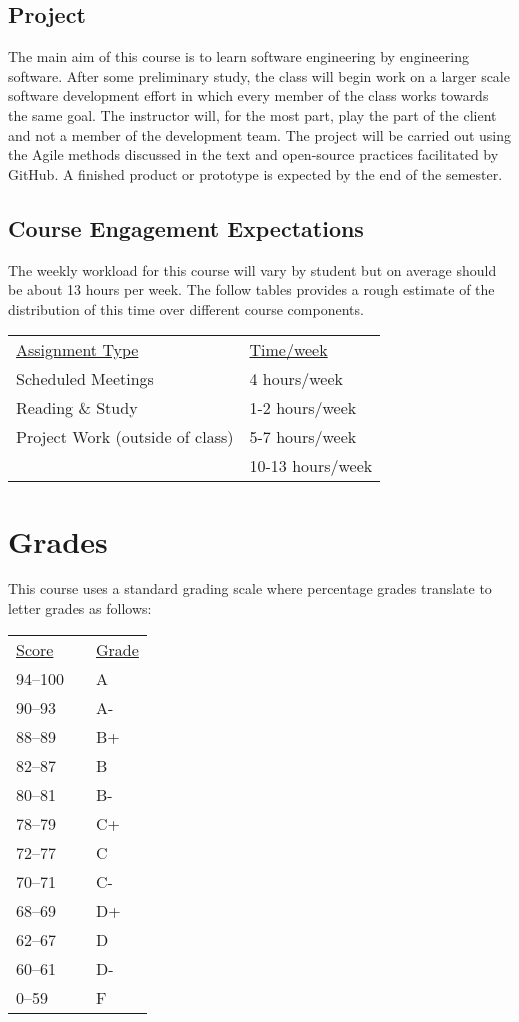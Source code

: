 \documentclass[10pt]{article}
\begin{document}
\subsection*{Project}

The main aim of this course is to learn software engineering by engineering software. After some preliminary study, the class will begin work on a larger scale software development effort in which every member of the class works towards the same goal. The instructor will, for the most part, play the part of the client and not a member of the development team. The project will be carried out using the Agile methods discussed in the text and open-source practices facilitated by GitHub. A finished product or prototype is expected by the end of the semester.


\subsection{Course Engagement Expectations}

The weekly workload for this course will vary by student but on average should be about 13 hours per week.  The follow tables provides a rough estimate of the distribution of this time over different course components.
\begin{center}
\begin{tabular}{ll}
\underline{Assignment Type} & \underline{Time/week} \\
Scheduled Meetings   & 4 hours/week \\
Reading \& Study          & 1-2 hours/week \\
Project Work (outside of class)  & 5-7 hours/week \\
\bottomrule
 & 10-13 hours/week
\end{tabular}
\end{center}


\section{Grades}

This course uses a standard grading scale where percentage grades translate to letter grades as follows:

\begin{center}
\begin{small}
\begin{tabular}{lcl}
\underline{Score} & & \underline{Grade} \\
94--100 & & A \\
90--93 & & A- \\
88--89 & & B+ \\
82--87 & & B \\
80--81 & & B- \\
78--79 & & C+ \\
72--77 & & C \\
70--71 & & C- \\
68--69 & & D+ \\
62--67 & & D \\
60--61 & & D- \\
0--59 & & F
\end{tabular}
\end{small}
\end{center}
\end{document}
